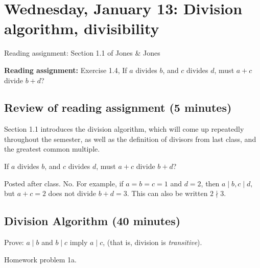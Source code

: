 \documentclass[letterpaper, 11 pt]{article}
\begin{document}
\section{Wednesday, January 13: Division algorithm, divisibility}%

 
 Reading assignment: Section 1.1 of Jones \& Jones
 
 {\bf Reading assignment:} Exercise 1.4, If $a$ divides $b$, and $c$ divides $d$, must $a +c$ divide $b+d$?



\subsection{Review of reading assignment (5 minutes)}
Section 1.1 introduces the division algorithm, which will come up repeatedly throughout the semester, as well as the definition of divisors from last class, and the greatest common multiple.

\begin{poll}
 If $a$ divides $b$, and $c$ divides $d$, must $a +c$ divide $b+d$?
\end{poll}

\begin{solution} Posted after class.
 No. For example, if $a=b=c=1$ and $d=2$, then $a\mid b, c\mid d,$ but $a+c=2$ does not divide $b+d=3$. This can also be written $2\nmid 3$.
\end{solution}

\subsection{Division Algorithm (40 minutes)}
\begin{br}[5 minutes] Prove: 
$a\mid b$ and $b\mid c$ imply $a\mid c$, (that is, division is \emph{transitive}).
\end{br}
\begin{solution}
 Homework problem 1a.
\end{solution}
\end{document}
